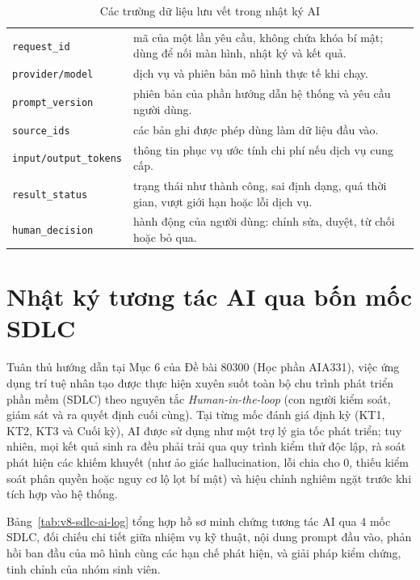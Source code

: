 \begin{table}[!htbp]
\centering
\small
\renewcommand{\arraystretch}{1.15}
\caption{Các trường dữ liệu lưu vết trong nhật ký AI}
\label{tab:v8-audit-fields}
\begin{tabularx}{\textwidth}{|L{4.2cm}|Y|}
\hline
{} & \\
\hline
\texttt{request\_id} & mã của một lần yêu cầu, không chứa khóa bí mật; dùng để nối màn hình, nhật ký và kết quả.\\
\hline
\texttt{provider/model} & dịch vụ và phiên bản mô hình thực tế khi chạy.\\
\hline
\texttt{prompt\_version} & phiên bản của phần hướng dẫn hệ thống và yêu cầu người dùng.\\
\hline
\texttt{source\_ids} & các bản ghi được phép dùng làm dữ liệu đầu vào.\\
\hline
\texttt{input/output\_tokens} & thông tin phục vụ ước tính chi phí nếu dịch vụ cung cấp.\\
\hline
\texttt{result\_status} & trạng thái như thành công, sai định dạng, quá thời gian, vượt giới hạn hoặc lỗi dịch vụ.\\
\hline
\texttt{human\_decision} & hành động của người dùng: chỉnh sửa, duyệt, từ chối hoặc bỏ qua.\\
\hline
\end{tabularx}
\end{table}

\section{Nhật ký tương tác AI qua bốn mốc SDLC}\label{sec:v8-sdlc-ai-log}

Tuân thủ hướng dẫn tại Mục 6 của Đề bài 80300 (Học phần AIA331), việc ứng dụng trí tuệ nhân tạo được thực hiện xuyên suốt toàn bộ chu trình phát triển phần mềm (SDLC) theo nguyên tắc \textit{Human-in-the-loop} (con người kiểm soát, giám sát và ra quyết định cuối cùng). Tại từng mốc đánh giá định kỳ (KT1, KT2, KT3 và Cuối kỳ), AI được sử dụng như một trợ lý gia tốc phát triển; tuy nhiên, mọi kết quả sinh ra đều phải trải qua quy trình kiểm thử độc lập, rà soát phát hiện các khiếm khuyết (như ảo giác hallucination, lỗi chia cho 0, thiếu kiểm soát phân quyền hoặc nguy cơ lộ lọt bí mật) và hiệu chỉnh nghiêm ngặt trước khi tích hợp vào hệ thống.

Bảng~\ref{tab:v8-sdlc-ai-log} tổng hợp hồ sơ minh chứng tương tác AI qua 4 mốc SDLC, đối chiếu chi tiết giữa nhiệm vụ kỹ thuật, nội dung prompt đầu vào, phản hồi ban đầu của mô hình cùng các hạn chế phát hiện, và giải pháp kiểm chứng, tinh chỉnh của nhóm sinh viên.

